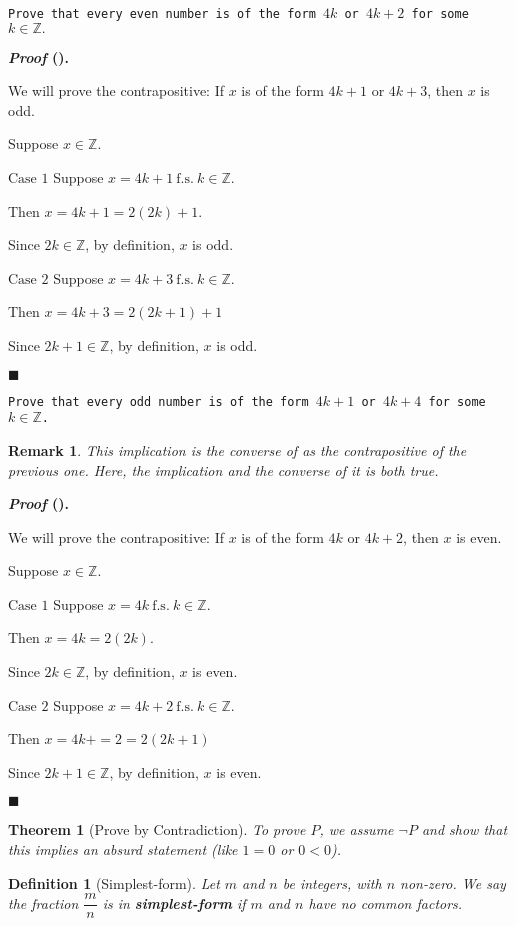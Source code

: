 \documentclass[12pt,a4paper]{article}
\newcounter{nprf}[subsection]
\newtheorem{thm}{Theorem}[subsection]
\newtheorem{df}{Definition}[subsection]
\newtheorem*{rmk}{\indent Remark}
\newenvironment*{prf}{\par\indent\textbf{\textit{Proof} (\stepcounter{nprf}\thenprf). }\par}{\par\hfill $\blacksquare$\par}
\def\Z{{\mathbb{Z}}}
\def\fs{\ \mathrm{f.s.}\ }
\begin{document}
\begin{framed}
\noindent\texttt{Prove that every even number is of the form $4k$ or $4k+2$ for some $k\in\Z.$}
\begin{prf}
	We will prove the contrapositive: If $x$ is of the form $4k+1$ or $4k+3$, then $x$ is odd. \par Suppose $x\in\Z$.\par $\boxed{\text{Case }1}$ Suppose $x=4k+1\fs k\in\Z$. \par Then $x=4k+1=2(2k)+1$.\par Since $2k\in\Z$, by definition, $x$ is odd. \par $\boxed{\text{Case }2}$ Suppose $x=4k+3\fs k\in\Z.$\par Then $x=4k+3=2(2k+1)+1$\par Since $2k+1\in\Z$, by definition, $x$ is odd. 
\end{prf}
\end{framed}
\begin{framed}
\noindent\texttt{Prove that every odd number is of the form $4k+1$ or $4k+4$ for some $k\in\Z$.}
\begin{rmk}	This implication is the converse of  as the contrapositive of the previous one. Here, the implication and the converse of it is both true.\end{rmk}
\begin{prf}
	We will prove the contrapositive: If $x$ is of the form $4k$ or $4k+2$, then $x$ is even.\par Suppose $x\in\Z.$ \par $\boxed{\text{Case }1}$ Suppose $x=4k\fs k\in\Z$. \par Then $x=4k=2(2k)$.\par Since $2k\in\Z$, by definition, $x$ is even. \par $\boxed{\text{Case }2}$ Suppose $x=4k+2\fs k\in\Z.$\par Then $x=4k+=2=2(2k+1)$\par Since $2k+1\in\Z$, by definition, $x$ is even. 
\end{prf}
\end{framed}
\begin{thm}[Prove by Contradiction]
	To prove $P$, we assume $\neg P$ and show that this implies an absurd statement (like $1=0$ or $0<0$).
\end{thm}
\begin{df}[Simplest-form]
	Let $m$ and $n$ be integers, with $n$ non-zero. We say the fraction $\dfrac{m}{n}$ is in \textbf{simplest-form} if $m$ and $n$ have no common factors.	
\end{df}
\end{document}
